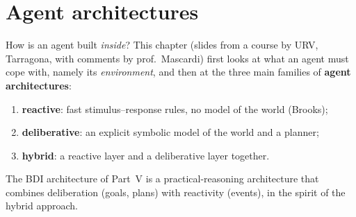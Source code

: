 \section{Agent architectures}
\label{sec:agent-architectures}

How is an agent built \emph{inside}? This chapter (slides from a course by URV, Tarragona,
with comments by prof.\ Mascardi) first looks at what an agent must cope with, namely its
\emph{environment}, and then at the three main families of \textbf{agent architectures}:
\begin{enumerate}[nosep]
  \item \textbf{reactive}: fast stimulus--response rules, no model of the world (Brooks);
  \item \textbf{deliberative}: an explicit symbolic model of the world and a planner;
  \item \textbf{hybrid}: a reactive layer and a deliberative layer together.
\end{enumerate}
The BDI architecture of Part~V is a practical-reasoning architecture that combines
deliberation (goals, plans) with reactivity (events), in the spirit of the hybrid approach.






